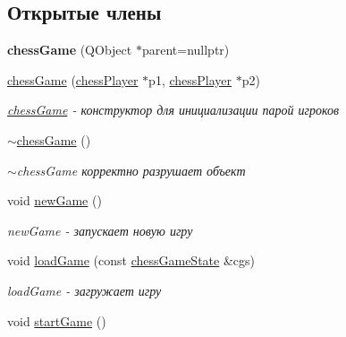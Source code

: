 \subsection*{Открытые члены}
\begin{DoxyCompactItemize}
\item 
\hypertarget{classchess_game_a1e6fc778faac96b97fd66af94baa3a49}{}{\bfseries chess\+Game} (Q\+Object $\ast$parent=nullptr)\label{classchess_game_a1e6fc778faac96b97fd66af94baa3a49}

\item 
\hyperlink{classchess_game_a3d92d77fbd1f6834e72b64d8a9472a96}{chess\+Game} (\hyperlink{classchess_player}{chess\+Player} $\ast$p1, \hyperlink{classchess_player}{chess\+Player} $\ast$p2)
\begin{DoxyCompactList}\small\item\em \hyperlink{classchess_game}{chess\+Game} -\/ конструктор для инициализации парой игроков \end{DoxyCompactList}\item 
\hypertarget{classchess_game_ab8015aeeb33def6b01df544d5de76c62}{}\hyperlink{classchess_game_ab8015aeeb33def6b01df544d5de76c62}{$\sim$chess\+Game} ()\label{classchess_game_ab8015aeeb33def6b01df544d5de76c62}

\begin{DoxyCompactList}\small\item\em $\sim$chess\+Game корректно разрушает объект \end{DoxyCompactList}\item 
\hypertarget{classchess_game_ac4434ee888280b15097641146900aedf}{}void \hyperlink{classchess_game_ac4434ee888280b15097641146900aedf}{new\+Game} ()\label{classchess_game_ac4434ee888280b15097641146900aedf}

\begin{DoxyCompactList}\small\item\em new\+Game -\/ запускает новую игру \end{DoxyCompactList}\item 
void \hyperlink{classchess_game_a7d444b87ac60a620f3ae3b03893478e1}{load\+Game} (const \hyperlink{classchess_game_state}{chess\+Game\+State} \&cgs)
\begin{DoxyCompactList}\small\item\em load\+Game -\/ загружает игру \end{DoxyCompactList}\item 
\hypertarget{classchess_game_aca8e8ecb362a1a21232e5221ad9f6870}{}void \hyperlink{classchess_game_aca8e8ecb362a1a21232e5221ad9f6870}{start\+Game} ()\label{classchess_game_aca8e8ecb362a1a21232e5221ad9f6870}


\end{DoxyCompactItemize}
